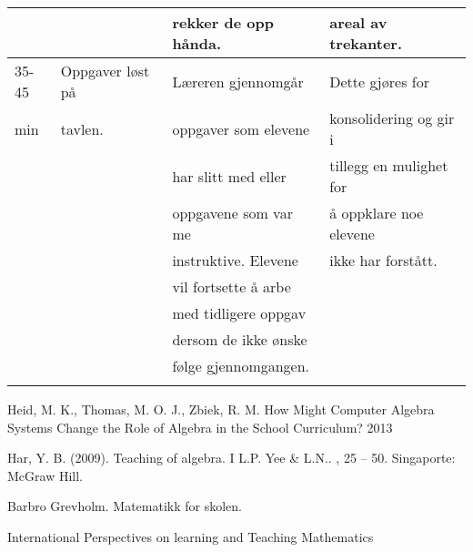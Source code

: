 \documentclass{article}
\begin{document}
\begin{center}
\begin{tabular}{l|l|l|l}
 &  & rekker de opp hånda. & areal av trekanter.\\
\hline
35-45 & Oppgaver løst på & Læreren gjennomgår & Dette gjøres for\\
min & tavlen. & oppgaver som elevene & konsolidering og gir i\\
 &  & har slitt med eller & tillegg en mulighet for\\
 &  & oppgavene som var me & å oppklare noe elevene\\
 &  & instruktive. Elevene & ikke har forstått.\\
 &  & vil fortsette å arbe & \\
 &  & med tidligere oppgav & \\
 &  & dersom de ikke ønske & \\
 &  & følge gjennomgangen. & \\
 &  &  & \\
\end{tabular}
\end{center}
\newpage
\begin{thebibliography}{2}
Heid, M. K., Thomas, M. O. J.,  Zbiek, R. M. 
\newblock How Might Computer Algebra Systems Change the Role of Algebra in the School Curriculum?
 2013

Har, Y. B. (2009). 
\newblock Teaching of algebra. I L.P. Yee \& L.N..  
,  25 – 50. Singaporte: McGraw Hill.

Barbro Grevholm.
\newblock Matematikk for skolen.

International Perspectives on learning and Teaching Mathematics
\end{thebibliography} 
\end{document}
